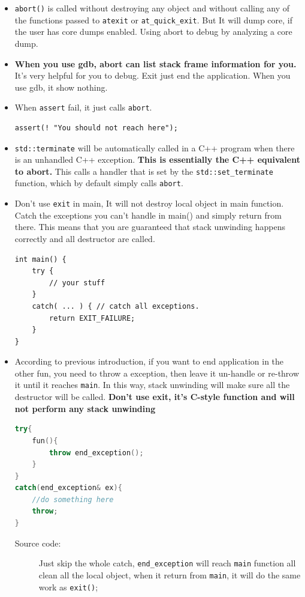 \documentclass[a4paper,11pt,twoside]{book}
\begin{document}
\begin{itemize}
	\item \texttt{abort()} is called without destroying any object and without calling any of the functions passed to \texttt{atexit} or \texttt{at\_quick\_exit}. But It will dump core, if the user has core dumps enabled. Using abort to debug by analyzing a core dump.
	
	\item \textbf{When you use gdb, abort can list stack frame information for you.} It's very helpful for you to debug.  Exit just end the application. When you use gdb, it show nothing.
	
	\item When \texttt{assert} fail, it just calls \texttt{abort}. 
\begin{lstlisting}[numbers=none]
assert(! "You should not reach here");
\end{lstlisting}
	
	\item \texttt{std::terminate} will be automatically called in a C++ program when there is an unhandled C++ exception. \textbf{This is essentially the C++ equivalent to abort.} This calls a handler that is set by the \texttt{std::set\_terminate} function, which by default simply calls \texttt{abort}.
	
	\item Don't use \texttt{exit} in main, It will not destroy local object in main function. Catch the exceptions you can't handle in main() and simply return from there. This means that you are guaranteed that stack unwinding happens correctly and all destructor are called.
\begin{lstlisting}[numbers=none]
int main() {
	try {
		// your stuff
	}
	catch( ... ) { // catch all exceptions.
		return EXIT_FAILURE;
	}
}
\end{lstlisting}
	
	\item According to previous introduction, if you want to end application in the other fun, you need to throw a exception, then leave it un-handle or re-throw it until it reaches \texttt{main}. In this way, stack unwinding will make sure all the destructor will be called. \textbf{Don't use exit, it's C-style function and will not perform any stack unwinding}
\begin{lstlisting}[frame=single, language=c++]
try{
	fun(){
		throw end_exception();
	}
}
catch(end_exception& ex){
	//do something here
	throw;
}
\end{lstlisting}
\begin{description}
	\item[Source code:] Just skip the whole catch, \texttt{end\_exception} will reach \texttt{main} function all clean all the local object, when it return from \texttt{main}, it will do the same work as \texttt{exit()};
\end{description}
	
\end{itemize}
\end{document}
